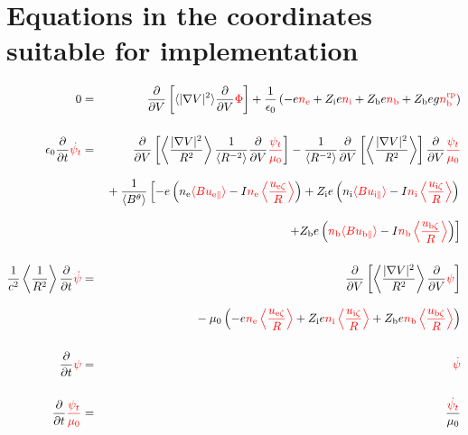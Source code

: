 \documentclass[11pt]{article}
\def\r#1{{\rm#1}}
\def\ave#1{\left\langle#1\right\rangle}
\def\aves#1{\langle#1\rangle}
\def\dd#1#2{\frac{\partial #1}{\partial #2}}
\def\para{\parallel}
\def\ddV{\frac{\partial}{\partial V}}
\def\psid{\dot{\psi}}
\def\psit{\psi_t}
\def\psitd{\dot{\psit}}
\def\nee{n_\r{e}}
\def\ni{n_\r{i}}
\def\nb{n_\r{b}}
\def\Zi{Z_\r{i}}
\def\Zb{Z_\r{b}}
\def\uezt{u_{\r{e}\zeta}}
\def\uizt{u_{\r{i}\zeta}}
\def\ubzt{u_{\r{b}\zeta}}
\def\uepara{u_{\r{e}\para}}
\def\uipara{u_{\r{i}\para}}
\def\ubpara{u_{\r{b}\para}}
\def\ddt{\frac{\partial}{\partial t}}
\def\nbrp{n_\r{b}^\r{rp}}
\def\red#1{\textcolor{red}{#1}}
\begin{document}
\bigskip

\section{Equations in the coordinates suitable for implementation}
\setcounter{equation}{0}

\begin{eqnarray}
  0 &=&
%
    \ddV \left[ \aves{|\nabla V|^2} \ddV{\red{\Phi}} \right]
%
  + \frac{1}{\epsilon_0}
%
    \left(-e \red{\nee} + \Zi e \red{\ni} + \Zb e \red{\nb} + \Zb e g \red{\nbrp} \right)
\\[5mm]
%
  \epsilon_0 \ddt \red{\psitd} &=&
%
     \ddV \left[ \ave{\frac{|\nabla V|^2}{R^2}} \frac{1}{\aves{R^{-2}}} \ddV \red{\frac{\psit}{\mu_0}} \right]
   - \frac{1}{\aves{R^{-2}}} \ddV \left[ \ave{\frac{|\nabla V|^2}{R^2}}
				  \right] \ddV  \red{\frac{\psit}{\mu_0}}
 \nonumber\\[3mm]&&{}
%
  + \frac{1}{\aves{B^\theta}}
%
    \left[-     e \left( \nee \red{\aves{B\uepara}} - I\red{\nee \ave{\frac{\uezt}{R}}} \right)
          + \Zi e \left( \ni \red{\aves{B\uipara}} - I\red{\ni  \ave{\frac{\uizt}{R}}} \right)
    \right.\nonumber\\[3mm]&&{}
    \left.+ \Zb e  \left( \red{\nb \aves{B\ubpara}} - I\red{\nb \ave{\frac{\ubzt}{R}}} \right) \right]
\\[5mm]
  \frac{1}{c^2} \ave{\frac{1}{R^2}} \ddt \red{\psid} &=&
%
  \ddV \left[ \ave{\frac{|\nabla V|^2}{R^2}}
				    \ddV \red{\psi} \right] \nonumber\\[3mm]&&{}
%
  - \mu_0 \left(-     e \red{\nee \ave{\frac{\uezt}{R}}}
                + \Zi e \red{\ni  \ave{\frac{\uizt}{R}}}
	        + \Zb e \red{\nb  \ave{\frac{\ubzt}{R}}} \right)
%
\\[5mm]
  \ddt \red{\psi} &=&
%
  \red{\psid}
\\[5mm]
  \ddt \red{\frac{\psit}{\mu_0}} &=&
%
  \frac{\red{\psitd}}{\mu_0}
\end{eqnarray}
%
\end{document}
